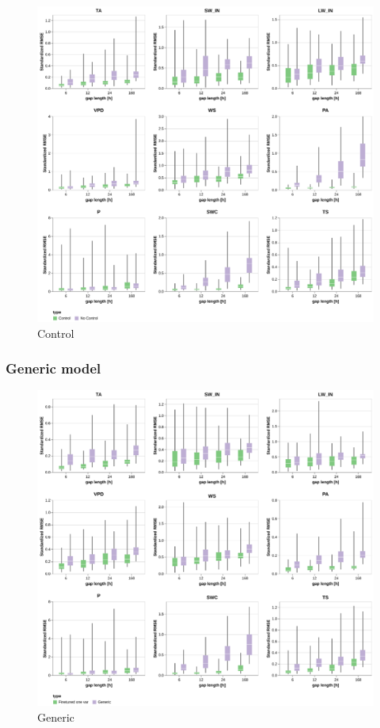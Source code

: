 \documentclass{article}
\newcommand{\imgwidth}{6in}
\begin{document}


\begin{figure}
\centerline{\includegraphics[width=\imgwidth]{images/use_control.png}}
\caption{Control}
\label{fig:control}
\end{figure}



\subsubsection{Generic model}

\begin{figure}
\centerline{\includegraphics[width=\imgwidth]{images/generic.png}}
\caption{Generic}
\label{fig:generic}
\end{figure}
\end{document}
